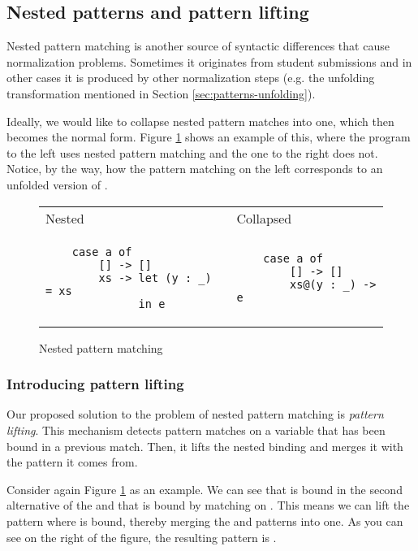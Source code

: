 \subsection{Nested patterns and pattern lifting}

Nested pattern matching is another source of syntactic differences that cause normalization problems. Sometimes it originates from student submissions and in other cases it is produced by other normalization steps (e.g. the unfolding transformation mentioned in Section \ref{sec:patterns-unfolding}).

Ideally, we would like to collapse nested pattern matches into one, which then becomes the normal form. Figure \ref{fig:patterns-nested-matching} shows an example of this, where the program to the left uses nested pattern matching and the one to the right does not. Notice, by the way, how the pattern matching on the left corresponds to an unfolded version of .

\begin{figure}
\centering
\begin{tabular}{ >{\centering\arraybackslash}m{17em} >{\centering\arraybackslash}m{13em} }
    Nested & Collapsed \\
    \begin{verbatim}
    case a of
        [] -> []
        xs -> let (y : _) = xs
              in e
    \end{verbatim}
    &
    \begin{verbatim}
    case a of
        [] -> []
        xs@(y : _) -> e
    \end{verbatim}
\end{tabular}
\caption{Nested pattern matching}
\label{fig:patterns-nested-matching}
\end{figure}

\subsubsection{Introducing pattern lifting}

Our proposed solution to the problem of nested pattern matching is \emph{pattern lifting}. This mechanism detects pattern matches on a variable that has been bound in a previous match. Then, it lifts the nested binding and merges it with the pattern it comes from.

Consider again Figure \ref{fig:patterns-nested-matching} as an example. We can see that  is bound in the second alternative of the  and that  is bound by matching on . This means we can lift the pattern where  is bound, thereby merging the  and  patterns into one. As you can see on the right of the figure, the resulting pattern is .

